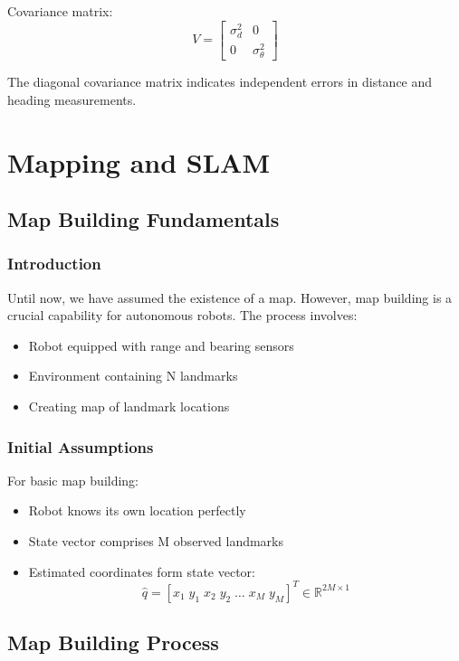 \documentclass[openany]{book}
\theoremstyle{definition}
\theoremstyle{remark}
\newcommand{\note}[1]{
\begin{tcolorbox}[colback=green!5,colframe=green!40!black,title=Note]
 #1
\end{tcolorbox}
}
\begin{document}
Covariance matrix:
\begin{equation}
V = 
\begin{bmatrix}
\sigma_d^2 & 0 \\
0 & \sigma_\theta^2
\end{bmatrix}
\end{equation}

\note{The diagonal covariance matrix indicates independent errors in distance and heading measurements.}

\chapter{Mapping and SLAM}

\section{Map Building Fundamentals}

\subsection{Introduction}
Until now, we have assumed the existence of a map. However, map building is a crucial capability for autonomous robots. The process involves:
\begin{itemize}
   \item Robot equipped with range and bearing sensors
   \item Environment containing N landmarks
   \item Creating map of landmark locations
\end{itemize}

\subsection{Initial Assumptions}
For basic map building:
\begin{itemize}
   \item Robot knows its own location perfectly
   \item State vector comprises M observed landmarks
   \item Estimated coordinates form state vector:
   \begin{equation}
       \hat{q} = [x_1 \; y_1 \; x_2 \; y_2 \; \ldots \; x_M \; y_M]^T \in \mathbb{R}^{2M\times1}
   \end{equation}
\end{itemize}

\section{Map Building Process}
\end{document}
